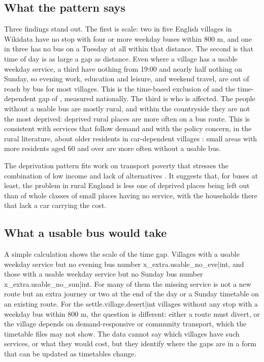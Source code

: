 \documentclass[11pt,a4paper]{article}
\begin{document}
\subsection{What the pattern says}
Three findings stand out. The first is scale: two in five English villages in Wikidata have no stop with four or more weekday buses within 800 m, and one in three has no bus on a Tuesday at all within that distance. The second is that time of day is as large a gap as distance. Even where a village has a usable weekday service, a third have nothing from 19:00 and nearly half nothing on Sunday, so evening work, education and leisure, and weekend travel, are out of reach by bus for most villages. This is the time-based exclusion of \citet{church2000} and the time-dependent gap of \citet{fransen2015}, measured nationally. The third is who is affected. The people without a usable bus are mostly rural, and within the countryside they are not the most deprived: deprived rural places are more often on a bus route. This is consistent with services that follow demand and with the policy concern, in the rural literature, about older residents in car-dependent villages \citep{shergold2012}: small areas with more residents aged 60 and over are more often without a usable bus.

The deprivation pattern fits work on transport poverty that stresses the combination of low income and lack of alternatives \citep{lucas2016,mattioli2017}. It suggests that, for buses at least, the problem in rural England is less one of deprived places being left out than of whole classes of small places having no service, with the households there that lack a car carrying the cost.

\subsection{What a usable bus would take}
A simple calculation shows the scale of the time gap. Villages with a usable weekday service but no evening bus number {{x_extra.usable_no_eve|int}}, and those with a usable weekday service but no Sunday bus number {{x_extra.usable_no_sun|int}}. For many of them the missing service is not a new route but an extra journey or two at the end of the day or a Sunday timetable on an existing route. For the {{settle.village.desert|int}} villages without any stop with a weekday bus within 800 m, the question is different: either a route must divert, or the village depends on demand-responsive or community transport, which the timetable files may not show. The data cannot say which villages have such services, or what they would cost, but they identify where the gaps are in a form that can be updated as timetables change.
\end{document}
